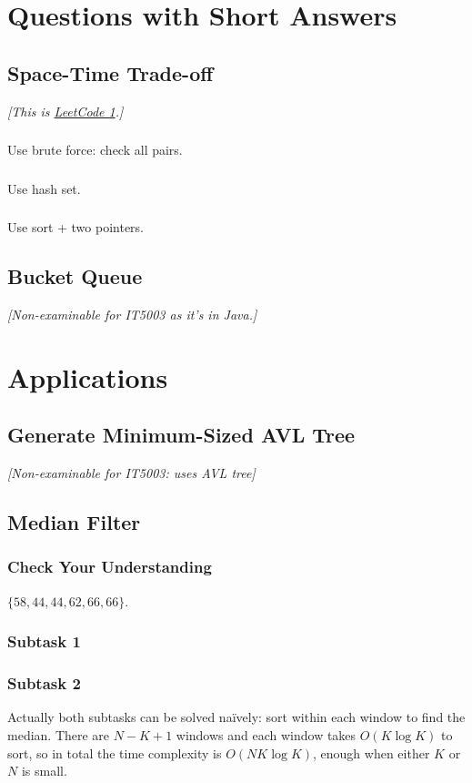 \documentclass[12pt]{article}
\begin{document}
\section{Questions with Short Answers}
\subsection{Space-Time Trade-off}
\textit{[This is \href{https://leetcode.com/problems/two-sum/}{LeetCode 1}.]}
\subsubsection{}
Use brute force: check all pairs.
\subsubsection{}
Use hash set.
\subsubsection{}
Use sort + two pointers.
\subsection{Bucket Queue}
\textit{[Non-examinable for IT5003 as it's in Java.]}
\section{Applications}
\subsection{Generate Minimum-Sized AVL Tree}
\textit{[Non-examinable for IT5003: uses AVL tree]}
\subsection{Median Filter}
\subsubsection{Check Your Understanding}
$\{58, 44, 44, 62, 66, 66\}.$
\subsubsection{Subtask 1}
\subsubsection{Subtask 2}
Actually both subtasks can be solved naïvely: sort within each window to find the median. There are $N - K + 1$ windows and each window takes $O(K\log K)$ to sort, so in total the time complexity is $O(NK\log K)$, enough when either $K$ or $N$ is small.
\end{document}
